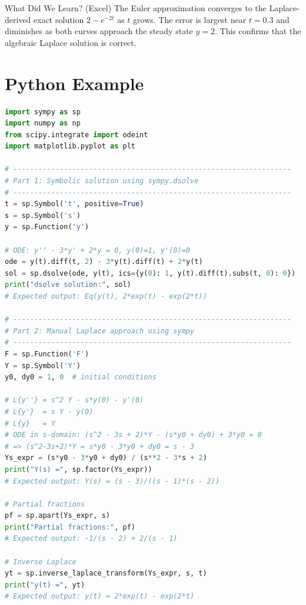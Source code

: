 \documentclass[12pt,a4paper]{article}
\begin{document}
\begin{learnbox}{What Did We Learn? (Excel)}
The Euler approximation converges to the Laplace-derived exact solution
$2 - e^{-2t}$ as $t$ grows. The error is largest near $t=0.3$ and
diminishes as both curves approach the steady state $y=2$. This confirms
that the algebraic Laplace solution is correct.
\end{learnbox}

\section{Python Example}

\begin{lstlisting}[language=Python, caption={Solving IVPs with SymPy Laplace transform and dsolve, plus numerical verification}]
import sympy as sp
import numpy as np
from scipy.integrate import odeint
import matplotlib.pyplot as plt

# ------------------------------------------------------------------
# Part 1: Symbolic solution using sympy.dsolve
# ------------------------------------------------------------------
t = sp.Symbol('t', positive=True)
s = sp.Symbol('s')
y = sp.Function('y')

# ODE: y'' - 3*y' + 2*y = 0, y(0)=1, y'(0)=0
ode = y(t).diff(t, 2) - 3*y(t).diff(t) + 2*y(t)
sol = sp.dsolve(ode, y(t), ics={y(0): 1, y(t).diff(t).subs(t, 0): 0})
print("dsolve solution:", sol)
# Expected output: Eq(y(t), 2*exp(t) - exp(2*t))

# ------------------------------------------------------------------
# Part 2: Manual Laplace approach using sympy
# ------------------------------------------------------------------
F = sp.Function('F')
Y = sp.Symbol('Y')
y0, dy0 = 1, 0  # initial conditions

# L{y''} = s^2 Y - s*y(0) - y'(0)
# L{y'}  = s Y - y(0)
# L{y}   = Y
# ODE in s-domain: (s^2 - 3s + 2)*Y - (s*y0 + dy0) + 3*y0 = 0
# => (s^2-3s+2)*Y = s*y0 - 3*y0 + dy0 = s - 3
Ys_expr = (s*y0 - 3*y0 + dy0) / (s**2 - 3*s + 2)
print("Y(s) =", sp.factor(Ys_expr))
# Expected output: Y(s) = (s - 3)/((s - 1)*(s - 2))

# Partial fractions
pf = sp.apart(Ys_expr, s)
print("Partial fractions:", pf)
# Expected output: -1/(s - 2) + 2/(s - 1)

# Inverse Laplace
yt = sp.inverse_laplace_transform(Ys_expr, s, t)
print("y(t) =", yt)
# Expected output: y(t) = 2*exp(t) - exp(2*t)


\end{lstlisting}
\end{document}
